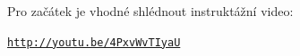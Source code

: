 Pro začátek je vhodné shlédnout instruktážní video: 
\begin{center}
	\href{http://youtu.be/4PxvWvTIyaU}{\texttt{http://youtu.be/4PxvWvTIyaU}}
\end{center}

\newpage





